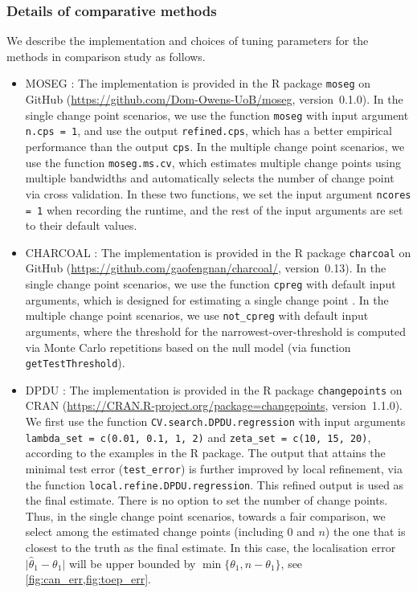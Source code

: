 \documentclass[11pt, a4paper]{article}
\def\wh{\widehat}
\newcommand{\cp}{\theta}
\theoremstyle{definition}
\theoremstyle{definition}
\theoremstyle{definition}
\theoremstyle{definition}
\theoremstyle{definition}
\theoremstyle{remark}
\theoremstyle{definition}
\theoremstyle{definition}
\theoremstyle{definition}
\begin{document}
\subsubsection{Details of comparative methods}\label{sec:add:cmp:detail}

We describe the implementation and choices of tuning parameters for the methods in comparison study as follows. 
\begin{itemize}
	\item 
	MOSEG \citep{cho2022high}: The implementation is provided in the R package \texttt{moseg} on GitHub (\url{https://github.com/Dom-Owens-UoB/moseg}, version~0.1.0). In the single change point scenarios, we use the function \texttt{moseg} with input argument \texttt{n.cps = 1}, and use the output \texttt{refined.cps}, which has a better empirical performance than the output \texttt{cps}. 
	In the multiple change point scenarios, we use the function \texttt{moseg.ms.cv}, which estimates multiple change points using multiple bandwidths and automatically selects the number of change point via cross validation. In these two functions, we set the input argument \texttt{ncores = 1} when recording the runtime, and the rest of the input arguments are set to their default values. 
	
	\item 
	CHARCOAL \citep{gao2022sparse}: The implementation is provided in the R package \texttt{charcoal} on GitHub (\url{https://github.com/gaofengnan/charcoal/}, version~0.13). In the single change point scenarios, we use the function \texttt{cpreg} with default input arguments, which is designed for estimating a single change point \citep[Algorithm~2]{gao2022sparse}. In the multiple change point scenarios, we use \texttt{not\_cpreg} with default input arguments, where the threshold for the narrowest-over-threshold is computed via Monte Carlo repetitions based on the null model (via function \texttt{getTestThreshold}). 
	
	\item 
	DPDU \citep{xu2022change}: The implementation is provided in the R package \texttt{changepoints} on CRAN (\url{https://CRAN.R-project.org/package=changepoints}, version~1.1.0). We first use the function \texttt{CV.search.DPDU.regression} with input arguments \texttt{lambda\_set = c(0.01, 0.1, 1, 2)} and \texttt{zeta\_set = c(10, 15, 20)}, according to the  examples in the R package. The output that attains the minimal test error (\texttt{test\_error}) is further improved by local refinement, via the function \texttt{local.refine.DPDU.regression}. This refined output is used as the final estimate. There is no option to set the number of change points. Thus, in the single change point scenarios, towards a fair comparison, we select among the estimated change points (including $0$ and $n$) the one that is closest to the truth as the final estimate. In this case, the localisation error $\vert\wh\cp_1-\cp_1\vert$ will be upper bounded by $\min\{\cp_1, n-\cp_1\}$, see \cref{fig:can_err,fig:toep_err}.
	

\end{itemize}
\end{document}
